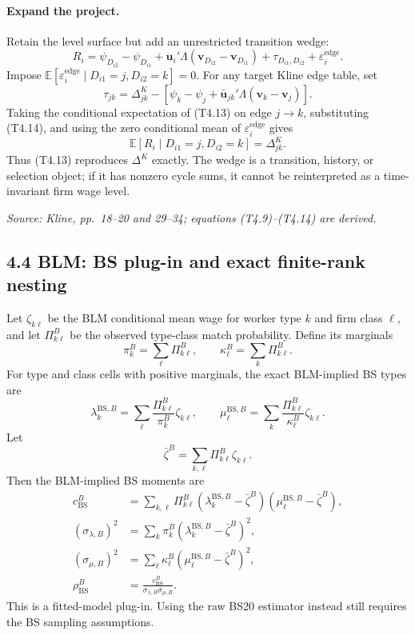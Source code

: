\documentclass[11pt]{article}
\begin{document}
\paragraph{Expand the project.}
Retain the level surface but add an unrestricted transition wedge:
\[
R_i
=
\psi_{D_{i2}}-\psi_{D_{i1}}
+\mathbf u_i'\Lambda
(\mathbf v_{D_{i2}}-\mathbf v_{D_{i1}})
+\tau_{D_{i1},D_{i2}}+\varepsilon_i^{\mathrm{edge}}.
\tag{T4.13}
\]
Impose
\(\mathbb E[\varepsilon_i^{\mathrm{edge}}
\mid D_{i1}=j,D_{i2}=k]=0\).
For any target Kline edge table, set
\[
\tau_{jk}
=
\Delta^K_{jk}
-\left[
\psi_k-\psi_j
+\bar{\mathbf u}_{jk}'\Lambda(\mathbf v_k-\mathbf v_j)
\right].
\tag{T4.14}
\]
Taking the conditional expectation of (T4.13) on edge \(j\to k\), substituting
(T4.14), and using the zero conditional mean of
\(\varepsilon_i^{\mathrm{edge}}\) gives
\[
\mathbb E[R_i\mid D_{i1}=j,D_{i2}=k]
=
\Delta^K_{jk}.
\tag{T4.14a}
\]
Thus (T4.13) reproduces \(\Delta^K\) exactly.  The wedge is a transition,
history, or selection object; if it has nonzero cycle sums, it cannot be
reinterpreted as a time-invariant firm wage level.

\textit{Source: Kline, pp.\ 18--20 and 29--34; equations
(T4.9)--(T4.14) are derived.}

\subsection{4.4 BLM: BS plug-in and exact finite-rank nesting}

Let \(\zeta_{k\ell}\) be the BLM conditional mean wage for worker type \(k\)
and firm class \(\ell\), and let \(\Pi^B_{k\ell}\) be the observed type-class
match probability.  Define its marginals
\[
\pi_k^B=\sum_\ell\Pi^B_{k\ell},
\qquad
\kappa_\ell^B=\sum_k\Pi^B_{k\ell}.
\tag{T4.15}
\]
For type and class cells with positive marginals, the exact BLM-implied BS
types are
\[
\lambda_k^{\mathrm{BS},B}
=
\sum_\ell\frac{\Pi^B_{k\ell}}{\pi_k^B}\zeta_{k\ell},
\qquad
\mu_\ell^{\mathrm{BS},B}
=
\sum_k\frac{\Pi^B_{k\ell}}{\kappa_\ell^B}\zeta_{k\ell}.
\tag{T4.16}
\]
Let
\[
\bar\zeta^B=\sum_{k,\ell}\Pi^B_{k\ell}\zeta_{k\ell}.
\tag{T4.16a}
\]
Then the BLM-implied BS moments are
\[
\begin{aligned}
c_{\mathrm{BS}}^B
&=\sum_{k,\ell}\Pi^B_{k\ell}
(\lambda_k^{\mathrm{BS},B}-\bar\zeta^B)
(\mu_\ell^{\mathrm{BS},B}-\bar\zeta^B),\\
(\sigma_{\lambda,B})^2
&=\sum_k\pi_k^B
(\lambda_k^{\mathrm{BS},B}-\bar\zeta^B)^2,\\
(\sigma_{\mu,B})^2
&=\sum_\ell\kappa_\ell^B
(\mu_\ell^{\mathrm{BS},B}-\bar\zeta^B)^2,\\
\rho_{\mathrm{BS}}^B
&=\frac{c_{\mathrm{BS}}^B}
{\sigma_{\lambda,B}\sigma_{\mu,B}}.
\end{aligned}
\tag{T4.16b}
\]
This is a fitted-model plug-in.  Using the raw BS20 estimator instead still
requires the BS sampling assumptions.
\end{document}
